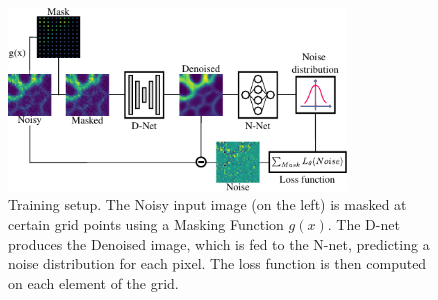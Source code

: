 \documentclass[lettersize,journal]{IEEEtran}
\begin{document}


\begin{figure}[!htbp]
  \begin{center}\includegraphics[width=0.8\textwidth]{fig_plomberie.pdf}
  \caption{Training setup.
The Noisy input image (on the left) is masked at certain grid points using a Masking Function $g(x)$. The D-net produces the Denoised image, which is fed to the N-net, predicting a noise distribution for each pixel.
The loss function is then computed on each element of the grid.
}
\label{fig:plumbing}
  \end{center}
\end{figure}


%
%
\end{document}
